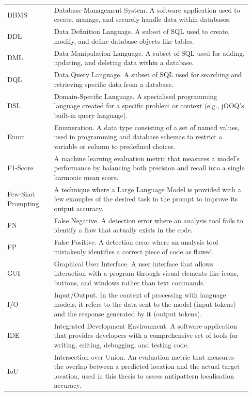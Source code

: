 \begin{longtable}{p{3cm}p{10cm}}
DBMS & Database Management System. A software application used to create, manage, and securely handle data within databases.\\
DDL & Data Definition Language. A subset of SQL used to create, modify, and define database objects like tables.\\
DML & Data Manipulation Language. A subset of SQL used for adding, updating, and deleting data within a database.\\
DQL & Data Query Language. A subset of SQL used for searching and retrieving specific data from a database.\\
DSL & Domain-Specific Language. A specialised programming language created for a specific problem or context (e.g., jOOQ's built-in query language).\\
Enum & Enumeration. A data type consisting of a set of named values, used in programming and database schemas to restrict a variable or column to predefined choices.\\
F1-Score & A machine learning evaluation metric that measures a model's performance by balancing both precision and recall into a single harmonic mean score.\\
Few-Shot \newline Prompting & A technique where a Large Language Model is provided with a few examples of the desired task in the prompt to improve its output accuracy.\\
FN & False Negative. A detection error where an analysis tool fails to identify a flaw that actually exists in the code.\\
FP & False Positive. A detection error where an analysis tool mistakenly identifies a correct piece of code as flawed.\\
GUI & Graphical User Interface. A user interface that allows interaction with a program through visual elements like icons, buttons, and windows rather than text commands.\\
I/O & Input/Output. In the context of processing with language models, it refers to the data sent to the model (input tokens) and the response generated by it (output tokens).\\
IDE & Integrated Development Environment. A software application that provides developers with a comprehensive set of tools for writing, editing, debugging, and testing code.\\
IoU & Intersection over Union. An evaluation metric that measures the overlap between a predicted location and the actual target location, used in this thesis to assess antipattern localisation accuracy.\\

\end{longtable}
